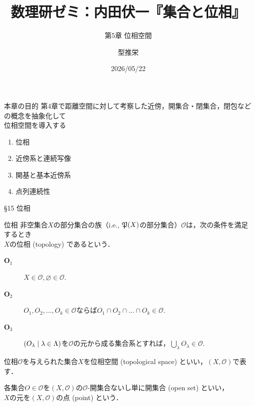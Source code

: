 \documentclass[uplatex,a4paper,dvipdfmx,aspectratio=169,11pt]{beamer}
\title[内田集合位相ゼミ2]{数理研ゼミ：内田伏一『集合と位相』}
\subtitle{第5章 位相空間}
\author{型推栄}
\institute[M1]{大学院情報理工学研究科 I専攻 岡本吉央研究室 M1}
\date{2026/05/22}
\begin{document}
\begin{frame}
    \titlepage
\end{frame}


\begin{frame}[fragile]{本章の目的}
    第4章で距離空間に対して考察した近傍，開集合・閉集合，閉包などの概念を抽象化して\\\alert{位相空間}を導入する

    \bigskip

    \begin{enumerate}
        \item[\S 15] 位相
        \item[\S 16] 近傍系と連続写像
        \item[\S 17] 開基と基本近傍系
        \item[\S 18] 点列連続性
    \end{enumerate}

\end{frame}

\newcommand{\Opens}{\mathscr{O}}
\newcommand{\Closeds}{\mathfrak{A}}

\begin{frame}[fragile]{\S 15 位相}
    \begin{block}{位相}
        非空集合$X$の部分集合の族（i.e., $\mathord{\mathfrak{P}}\qty(X)$の部分集合）$\Opens$は，次の条件を満足するとき\\$X$の\alert{位相} (topology) であるという．
       \begin{description}
           \item[$\textbf{O}_1$] $X \in \Opens, \varnothing \in \Opens$.
           \item[$\textbf{O}_2$] $O_1, O_2, \ldots, O_k \in \Opens$ならば$O_1 \cap O_2 \cap \dots \cap O_k \in \Opens$.
           \item[$\textbf{O}_3$] $\qty(O_\lambda \mid \lambda \in \Lambda)$を$\Opens$の元から成る集合系とすれば，$\bigcup_\lambda O_\lambda \in \Opens$.
       \end{description} 
    \end{block}

    \medskip{}

    位相$\Opens$を与えられた集合$X$を\alert{位相空間} (topological space) といい，$(X, \Opens)$で表す．

    各集合$O \in \Opens$を$(X, \Opens)$の\alert{$\Opens$-開集合}ないし単に\alert{開集合} (open set) といい，\\
    $X$の元を$(X, \Opens)$の\alert{点} (point) という．
\end{frame}
\end{document}
